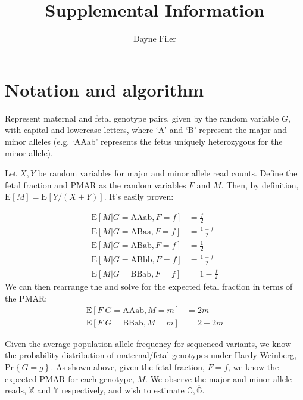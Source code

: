 \documentclass{article}\usepackage[]{graphicx}\usepackage[]{color}
\newcommand{\pr}[2][]{\text{Pr}_{#1}\left\{#2\right\}}
\newcommand{\E}[2][]{\text{E}_{#1}\left[#2\right]}
\begin{document}
\title{Supplemental Information}
\author{Dayne Filer}
\maketitle

\tableofcontents

\newpage
\section{Notation and algorithm}

Represent maternal and fetal genotype pairs, given by the random variable $G$, with capital and lowercase letters, where `A' and `B' represent the major and minor alleles (e.g. `AAab' represents the fetus uniquely heterozygous for the minor allele).

Let $X,Y$ be random variables for major and minor allele read counts.
Define the fetal fraction and PMAR as the random variables $F$ and $M$. Then, by definition, $\E{M} = \E{Y/(X + Y)}$.
It's easily proven:

\begin{align}
\text{E}[M \rvert G = \text{AAab}, F = f] &= \frac{f}{2} \label{eq:mAAab}\\
\text{E}[M \rvert G = \text{ABaa}, F = f] &= \frac{1 - f}{2} \label{eq:mABaa} \\
\text{E}[M \rvert G = \text{ABab}, F = f] &= \frac{1}{2} \label{eq:mABab} \\
\text{E}[M \rvert G = \text{ABbb}, F = f] &= \frac{1 + f}{2} \label{eq:mABbb} \\
\text{E}[M \rvert G = \text{BBab}, F = f] &= 1 - \frac{f}{2} \label{eq:mBBab}
\end{align}
We can then rearrange the  and solve for the expected fetal fraction in terms of the PMAR:
\begin{align}
\text{E}[F \rvert G = \text{AAab}, M = m] &= 2m \label{eq:fAAab} \\
\text{E}[F \rvert G = \text{BBab}, M = m] &= 2 - 2m \label{eq:fBBab}
\end{align}

Given the average population allele frequency for sequenced variants, we know the probability distribution of maternal/fetal genotypes under Hardy-Weinberg, $\pr{G = g}$.
As shown above, given the fetal fraction, $F = f$, we know the expected PMAR for each genotype, $M$.
We observe the major and minor allele reads, $\mathbb{X}$ and $\mathbb{Y}$ respectively, and wish to estimate $\mathbb{G}, \hat{\mathbb{G}}$.
\end{document}
